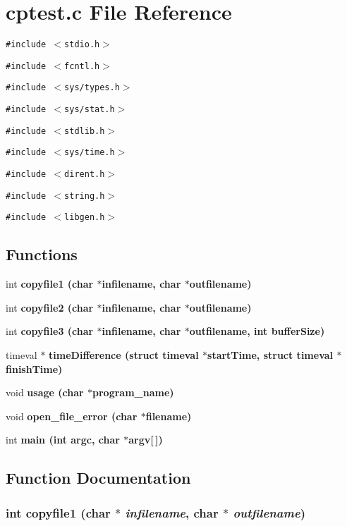 \section{cptest.c File Reference}
\label{cptest_8c}
{\tt \#include $<$stdio.h$>$}\par
{\tt \#include $<$fcntl.h$>$}\par
{\tt \#include $<$sys/types.h$>$}\par
{\tt \#include $<$sys/stat.h$>$}\par
{\tt \#include $<$stdlib.h$>$}\par
{\tt \#include $<$sys/time.h$>$}\par
{\tt \#include $<$dirent.h$>$}\par
{\tt \#include $<$string.h$>$}\par
{\tt \#include $<$libgen.h$>$}\par
\subsection*{Functions}
\begin{CompactItemize}
\item 
int \bf{copyfile1} (char $\ast$infilename, char $\ast$outfilename)
\item 
int \bf{copyfile2} (char $\ast$infilename, char $\ast$outfilename)
\item 
int \bf{copyfile3} (char $\ast$infilename, char $\ast$outfilename, int buffer\-Size)
\item 
timeval $\ast$ \bf{time\-Difference} (struct timeval $\ast$start\-Time, struct timeval $\ast$finish\-Time)
\item 
void \bf{usage} (char $\ast$program\_\-name)
\item 
void \bf{open\_\-file\_\-error} (char $\ast$filename)
\item 
int \bf{main} (int argc, char $\ast$argv[$\,$])
\end{CompactItemize}


\subsection{Function Documentation}
\subsubsection{\setlength{\rightskip}{0pt plus 5cm}int copyfile1 (char $\ast$ {\em infilename}, char $\ast$ {\em outfilename})}\label{cptest_8c_97d29821b578fd3c9ea2482e77bebfc5}


